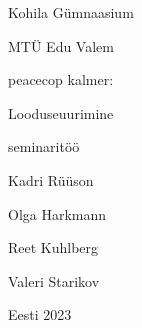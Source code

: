 \begin{titlepage}
\par{Kohila Gümnaasium}
\par{MTÜ Edu Valem}
\vspace{0.3\textheight}
\par{peacecop kalmer:}
\LARGE
\par{Looduseuurimine}
\normalsize
\par{seminaritöö}
\vspace{0.3\textheight}
\begin{flushright}
\par{Kadri Rüüson}
\par{Olga Harkmann}
\par{Reet Kuhlberg}
\par{Valeri Starikov}
\end{flushright}
\vfill
Eesti
\hfill
2023
\end{titlepage}
